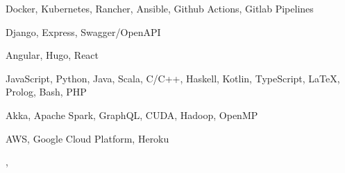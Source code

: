 

\begin{cvskills}

    {Docker, Kubernetes, Rancher, Ansible, Github Actions, Gitlab Pipelines} %

    {Django, Express, Swagger/OpenAPI} %

    {Angular, Hugo, React} %

    {JavaScript, Python, Java, Scala, C/C++, Haskell, Kotlin, TypeScript, LaTeX, Prolog, Bash, PHP} %

    {Akka, Apache Spark, GraphQL, CUDA, Hadoop, OpenMP}

    {AWS, Google Cloud Platform, Heroku}

    {,
    } %

\end{cvskills}
